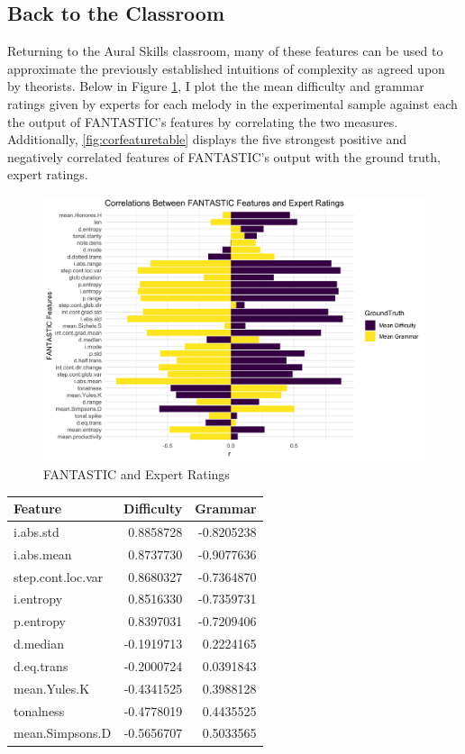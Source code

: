 \documentclass[]{book}
\begin{document}
\hypertarget{back-to-the-classroom}{%
\subsection{Back to the Classroom}\label{back-to-the-classroom}}

Returning to the Aural Skills classroom, many of these features can be used to approximate the previously established intuitions of complexity as agreed upon by theorists.
Below in Figure \ref{fig:corfeature}, I plot the the mean difficulty and grammar ratings given by experts for each melody in the experimental sample against each the output of FANTASTIC's features by correlating the two measures.
Additionally, \ref{fig:corfeaturetable} displays the five strongest positive and negatively correlated features of FANTASTIC's output with the ground truth, expert ratings.

\begin{figure}

{\centering \includegraphics[width=1\linewidth]{img/FantasticExpertPlot} 

}

\caption{FANTASTIC and Expert Ratings}\label{fig:corfeature}
\end{figure}

\begin{longtable}[]{@{}lrr@{}}
\toprule
Feature & Difficulty & Grammar\tabularnewline
\midrule
\endhead
i.abs.std & 0.8858728 & -0.8205238\tabularnewline
i.abs.mean & 0.8737730 & -0.9077636\tabularnewline
step.cont.loc.var & 0.8680327 & -0.7364870\tabularnewline
i.entropy & 0.8516330 & -0.7359731\tabularnewline
p.entropy & 0.8397031 & -0.7209406\tabularnewline
d.median & -0.1919713 & 0.2224165\tabularnewline
d.eq.trans & -0.2000724 & 0.0391843\tabularnewline
mean.Yules.K & -0.4341525 & 0.3988128\tabularnewline
tonalness & -0.4778019 & 0.4435525\tabularnewline
mean.Simpsons.D & -0.5656707 & 0.5033565\tabularnewline
\bottomrule
\end{longtable}
\end{document}
